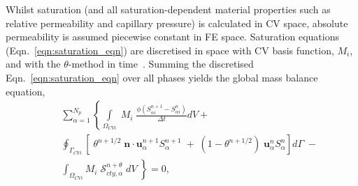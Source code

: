 \documentclass[preprint,authoryear,12pt]{elsarticle}
\newcommand{\PN}[2][error]{P$_{#1}$DG-P$_{#2}$}
\newcommand{\PNDG}[2][error]{P$_{#1}$DG-P$_{#2}$DG}
\begin{document}
\medskip
Whilst saturation (and all saturation-dependent material properties such as relative permeability and capillary pressure) is calculated in CV space, absolute permeability is assumed piecewise constant in FE space. Saturation equations (Eqn.~\ref{eqn:saturation_eqn}) are discretised in space with CV basis function, $M_{i}$, and with the $\theta$-method in time~\citep{gomes_book_2012}. 
Summing the discretised Eqn.~\ref{eqn:saturation_eqn} over all phases yields the global mass balance equation,
\begin{eqnarray}
 && \sum_{\alpha=1}^{N_{p}} \left\{\int\limits_{\Omega_{CVi}} \; M_{i} \; \frac{\phi\left(S_{\alpha i}^{n+1}-S_{\alpha i}^{n}\right)}{\Delta t} dV\right.  + \nonumber\\
 &&  \oint_{\Gamma_{CVi}} \left[\; \theta^{n+1/2}\; {\mathbf n}\cdot {\mathbf u}_{\alpha}^{n+1}S_{\alpha}^{n+1} \; + \; \left(1-\theta^{n+1/2}\right) \; {\mathbf u}_{\alpha}^{n}S_{\alpha}^{n}\right] d\Gamma \;- \nonumber\\
 &&  \left.\int_{\Omega_{CVi}} M_{i} \; \mathcal{S}_{cty,\alpha}^{n+\theta} \; dV\;\right\} =0,
\label{global_mass_balance}
\end{eqnarray}

\end{document}
